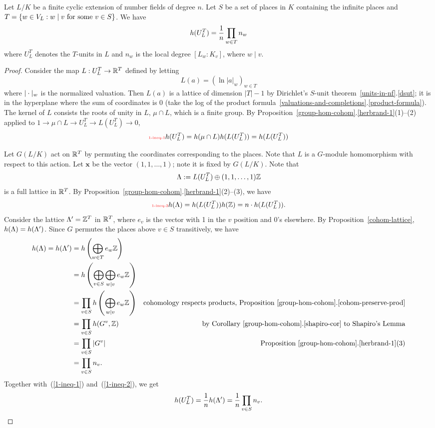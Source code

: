 \begin{pr}
Let $L/K$ be a finite cyclic extension of number fields of degree $n$.
Let $S$ be a set of places in $K$ containing the infinite places and $T=\left\{{w\in V_L}:{w\mid v\text{ for some }v\in S}\right\}$.
We have
\[
h(U_L^T)=\frac{1}{n}\prod_{w\in T} n_w
\]
where $U_L^T$ denotes the $T$-units in $L$ and $n_w$ is the local degree $[L_w:K_v]$, where $w\mid v$. %
\end{pr}
\begin{proof}
Consider the map $L:U_L^T\to \mathbb{R}^{T}$ defined by letting
\[
L(a)=(\ln|a|_w)_{w\in T}%
\]
where $|\cdot|_w$ is the normalized valuation. %
Then $L(a)$ is a lattice of dimension $|T|-1$ by Dirichlet's $S$-unit theorem~\ref{units-in-nf}.\ref{dsut}; it is in the hyperplane where the sum of coordinates is 0 (take the log of the product formula~\ref{valuations-and-completions}.\ref{product-formula}). 
The kernel of $L$ consists the roots of unity in $L$, $\mu\cap L$, which is a finite group. By Proposition~\ref{group-hom-cohom}.\ref{herbrand-1}(1)--(2) applied to $1\to \mu\cap L\to U_L^T\to L(U_L^T)\to 0$,  
\begin{equation}\llabel{1-ineq-1}
h(U_L^T)=h(\mu\cap L)h(L(U_L^T))=h(L(U_L^T))
\end{equation}

Let $G(L/K)$ act on $\mathbb{R}^T$ by permuting the coordinates corresponding to the places. Note that $L$ is a $G$-module homomorphism with respect to this action. 
Let $\mathbf x$ be the vector $(1,1,\ldots, 1)$; note it is fixed by $G(L/K)$. Note that 
\[
\Lambda:=
L(U_L^T)\oplus (1,1,\ldots,1)\mathbb{Z}
\]
is a full lattice in $\mathbb{R}^T$. By Proposition~\ref{group-hom-cohom}.\ref{herbrand-1}(2)--(3), we have
\begin{equation}\llabel{1-ineq-2}
h(\La)=h(L(U_L^T))h(\Z)=n\cdot h(L(U_L^T)).
\end{equation}
Consider the lattice $\La'=%
\Z^T$ in $\mathbb{R}^T$, where $e_v$ is the vector with 1 in the $v$ position and 0's elsewhere. 
By Proposition~\ref{cohom-lattice}, $h(\Lambda)=h(\Lambda')$. Since $G$ permutes the places above $v\in S$ transitively, 
we have
\begin{align*}
h(\Lambda)=h(\Lambda')&=h\left( {\bigoplus_{w\in T} e_w\mathbb{Z}} \right)\\
&=h\left( {\bigoplus_{v\in S}\bigoplus_{w\mid v} e_w \mathbb{Z}} \right)\\
&=\prod_{v\in S} h\left( {\bigoplus_{w\mid v} e_w\mathbb{Z}} \right)&\text{cohomology respects products, Proposition~\ref{group-hom-cohom}.\ref{cohom-preserve-prod}}\\
&=\prod_{v\in S} h(G^v,\mathbb{Z})&
\text{by Corollary~\ref{group-hom-cohom}.\ref{shapiro-cor} to Shapiro's Lemma}\\
&=\prod_{v\in S} |G^v|&\text{Proposition~\ref{group-hom-cohom}.\ref{herbrand-1}(3)}\\
&=\prod_{v\in S} n_v.
\end{align*}
Together with~(\ref{1-ineq-1}) and~(\ref{1-ineq-2}), we get
\[
h(U_L^T)=\frac{1}{n}h(\Lambda')=\frac{1}{n}\prod_{v\in S} n_v.
\qedhere
\]
\end{proof}
